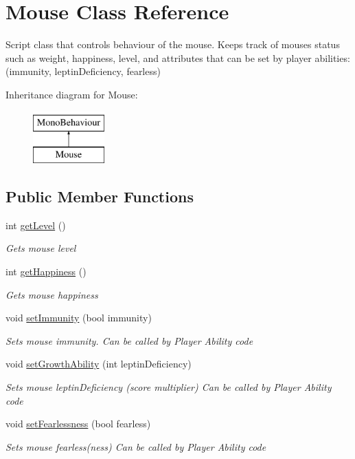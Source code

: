 \hypertarget{class_mouse}{}\section{Mouse Class Reference}
\label{class_mouse}


Script class that controls behaviour of the mouse. Keeps track of mouses status such as weight, happiness, level, and attributes that can be set by player abilities\+: (immunity, leptin\+Deficiency, fearless)  


Inheritance diagram for Mouse\+:\begin{figure}[H]
\begin{center}
\leavevmode
\includegraphics[height=2.000000cm]{class_mouse}
\end{center}
\end{figure}
\subsection*{Public Member Functions}
\begin{DoxyCompactItemize}
\item 
int \hyperlink{class_mouse_af6ea562cc24964aedd1a366bb5d0ff64}{get\+Level} ()
\begin{DoxyCompactList}\small\item\em Gets mouse level \end{DoxyCompactList}\item 
int \hyperlink{class_mouse_ab21c11a85fa2e820dfd4a5518e95eae3}{get\+Happiness} ()
\begin{DoxyCompactList}\small\item\em Gets mouse happiness \end{DoxyCompactList}\item 
void \hyperlink{class_mouse_a2b85cb7132ba132f01827968b04cb96f}{set\+Immunity} (bool immunity)
\begin{DoxyCompactList}\small\item\em Sets mouse immunity. Can be called by Player Ability code \end{DoxyCompactList}\item 
void \hyperlink{class_mouse_a591b2257ad6d7c1afe7fb1d99d3a49be}{set\+Growth\+Ability} (int leptin\+Deficiency)
\begin{DoxyCompactList}\small\item\em Sets mouse leptin\+Deficiency (score multiplier) Can be called by Player Ability code \end{DoxyCompactList}\item 
void \hyperlink{class_mouse_a4fac6637572e551f2bc72d82b3b9f251}{set\+Fearlessness} (bool fearless)
\begin{DoxyCompactList}\small\item\em Sets mouse fearless(ness) Can be called by Player Ability code \end{DoxyCompactList}\end{DoxyCompactItemize}
